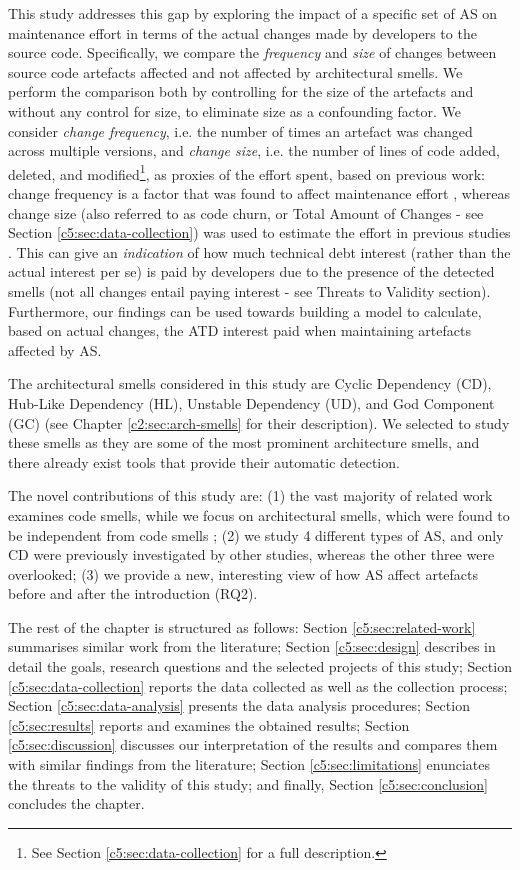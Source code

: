 This study addresses this gap by exploring the impact of a specific set of AS on maintenance effort in terms of the actual changes made by developers to the source code.
Specifically, we compare the  \emph{frequency} and \emph{size} of changes between source code artefacts affected and not affected by architectural smells. We perform the comparison both by controlling for the size of the artefacts and without any control for size, to eliminate size as a confounding factor.
We consider \emph{change frequency}, i.e. the number of times an artefact was changed across multiple versions, and \emph{change size}, i.e. the number of lines of code added, deleted, and modified\footnote{See Section \ref{c5:sec:data-collection} for a full description.}, as proxies of the effort spent, based on previous work: change frequency is a factor that was found to affect maintenance effort \cite{Sjoberg2013,Olbrich2009}, whereas change size (also referred to as code churn, or Total Amount of Changes - see Section \ref{c5:sec:data-collection}) was used to estimate the effort in previous studies \cite{ElEmam2000,Mockus2000}.
This can give an \emph{indication} of how much technical debt interest (rather than the actual interest per se) is paid by developers due to the presence of the detected smells (not all changes entail paying interest - see Threats to Validity section).
Furthermore, our findings can be used towards building a model to calculate, based on actual changes, the ATD interest \cite{Avgeriou2016} paid when maintaining artefacts affected by AS.

The architectural smells considered in this study are Cyclic Dependency (CD), Hub-Like Dependency (HL), Unstable Dependency (UD), and God Component (GC) \cite{Arcelli2016, Lippert2006,Sas2019} (see Chapter \ref{c2:sec:arch-smells} for their description).
We selected to study these smells as they are some of the most prominent architecture smells, and there already exist tools that provide their automatic detection.

The novel contributions of this study are: (1) the vast majority of related work examines code smells, while we focus on architectural smells, which were found to be independent from code smells \cite{Arcelli2019}; (2) we study 4 different types of AS, and only CD were previously investigated by other studies, whereas the other three were overlooked; (3) we provide a new, interesting view of how AS affect artefacts before and after the introduction (RQ2).

The rest of the chapter is structured as follows:
Section \ref{c5:sec:related-work} summarises similar work from the literature; Section \ref{c5:sec:design} describes in detail the goals, research questions and the selected projects of this study; Section \ref{c5:sec:data-collection} reports the data collected as well as the collection process; Section \ref{c5:sec:data-analysis} presents the data analysis procedures; Section \ref{c5:sec:results} reports and examines the obtained results; Section \ref{c5:sec:discussion} discusses our interpretation of the results and compares them with similar findings from the literature; Section \ref{c5:sec:limitations} enunciates the threats to the validity of this study; and finally, Section \ref{c5:sec:conclusion} concludes the chapter.


